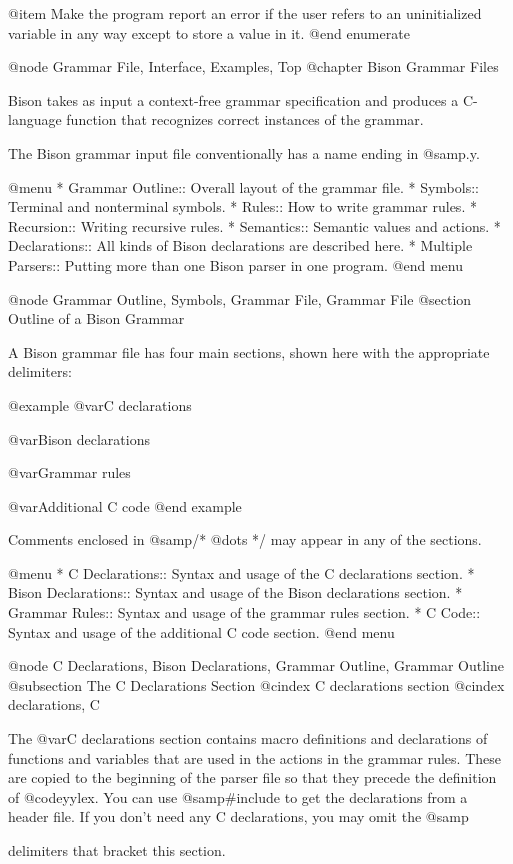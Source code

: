 {{{{{{{{{{{{{{@item
Make the program report an error if the user refers to an
uninitialized variable in any way except to store a value in it.
@end enumerate

@node Grammar File, Interface, Examples, Top
@chapter Bison Grammar Files

Bison takes as input a context-free grammar specification and produces a
C-language function that recognizes correct instances of the grammar.

The Bison grammar input file conventionally has a name ending in @samp{.y}.

@menu
* Grammar Outline::    Overall layout of the grammar file.
* Symbols::            Terminal and nonterminal symbols.
* Rules::              How to write grammar rules.
* Recursion::          Writing recursive rules.
* Semantics::          Semantic values and actions.
* Declarations::       All kinds of Bison declarations are described here.
* Multiple Parsers::   Putting more than one Bison parser in one program.
@end menu

@node Grammar Outline, Symbols, Grammar File, Grammar File
@section Outline of a Bison Grammar

A Bison grammar file has four main sections, shown here with the
appropriate delimiters:

@example
@var{C declarations}

@var{Bison declarations}

@var{Grammar rules}

@var{Additional C code}
@end example

Comments enclosed in @samp{/* @dots{} */} may appear in any of the sections.

@menu
* C Declarations::      Syntax and usage of the C declarations section.
* Bison Declarations::  Syntax and usage of the Bison declarations section.
* Grammar Rules::       Syntax and usage of the grammar rules section.
* C Code::              Syntax and usage of the additional C code section.
@end menu

@node C Declarations, Bison Declarations, Grammar Outline, Grammar Outline
@subsection The C Declarations Section
@cindex C declarations section
@cindex declarations, C

The @var{C declarations} section contains macro definitions and
declarations of functions and variables that are used in the actions in the
grammar rules.  These are copied to the beginning of the parser file so
that they precede the definition of @code{yylex}.  You can use
@samp{#include} to get the declarations from a header file.  If you don't
need any C declarations, you may omit the @samp{%
delimiters that bracket this section.

}}}}}}}}}}}}}}}
